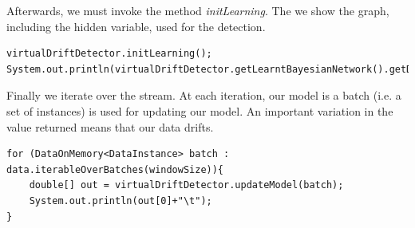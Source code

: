 \documentclass[10pt,a4paper]{article}
\begin{document}
Afterwards, we must invoke the method \textit{initLearning}. The we show the graph, including the hidden variable, used for the detection.

\begin{verbatim}
virtualDriftDetector.initLearning();
System.out.println(virtualDriftDetector.getLearntBayesianNetwork().getDAG());
\end{verbatim}


Finally we iterate over the stream. At each iteration, our model is a batch (i.e. a set of instances) is used for updating our model. An important variation in the value returned means that our data drifts.

\begin{verbatim}
for (DataOnMemory<DataInstance> batch : data.iterableOverBatches(windowSize)){
    double[] out = virtualDriftDetector.updateModel(batch);
    System.out.println(out[0]+"\t");
}
\end{verbatim}
\end{document}
